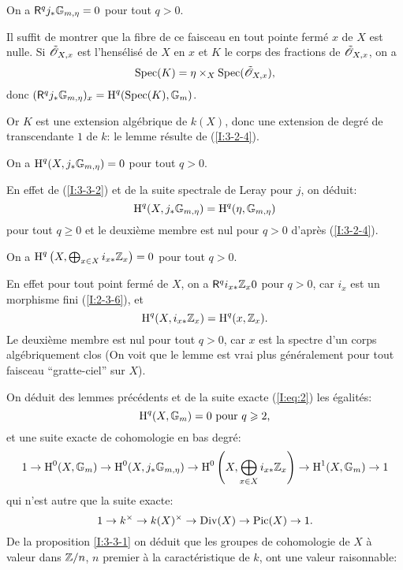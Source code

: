 \documentclass[oneside]{book}
\begin{document}
\begin{lemma}\label{I:3-3-2}
On a $\mathsf{R}^q j_* \mathbb{G}_{m,\eta} = 0$ pour tout $q>0$.
\end{lemma}

Il suffit de montrer que la fibre de ce faisceau en tout pointe fermé $x$ 
de $X$ est nulle. Si $\tilde{\mathscr{O}}_{X,x}$ est l'hensélisé de $X$ en $x$ et $K$ 
le corps des fractions de $\tilde{\mathscr{O}}_{X,x}$, on a 
\[
  \operatorname{Spec}(K) = \eta\times_X \operatorname{Spec}(\tilde{\mathscr{O}}_{X,x})\text{,}
\]
donc $(\mathsf{R}^qj_*\mathbb{G}_{m,\eta})_x = \operatorname{H}^q(\operatorname{Spec}(K),\mathbb{G}_m)$. 

Or $K$ est une extension algébrique de $k(X)$, donc une extension de degré 
de transcendante $1$ de $k$: le lemme résulte de (\ref{I:3-2-4}). 





\begin{lemma}\label{I:3-3-3}
On a $\operatorname{H}^q(X, j_*\mathbb{G}_{m,\eta}) = 0$ pour tout $q>0$.
\end{lemma}

En effet de (\ref{I:3-3-2}) et de la suite spectrale de Leray pour $j$, on 
déduit:
\[
  \operatorname{H}^q(X, j_* \mathbb{G}_{m,\eta}) = \operatorname{H}^q(\eta,\mathbb{G}_{m,\eta})
\]
pour tout $q\geqslant 0$ et le deuxième membre est nul pour $q>0$ d'après 
(\ref{I:3-2-4}). 





\begin{lemma}\label{I:3-3-4}
On a $\operatorname{H}^q\left(X,\bigoplus_{x\in X} i_{x*} \mathbb{Z}_x\right) = 0$ pour tout $q>0$. 
\end{lemma}

En effet pour tout point fermé de $X$, on a $\mathsf{R}^q i_{x*}\mathbb{Z}_x 0$ pour $q>0$, 
car $i_x$ est un morphisme fini (\ref{I:2-3-6}), et 
\[
  \operatorname{H}^q(X,i_{x*}\mathbb{Z}_x) = \operatorname{H}^q(x,\mathbb{Z}_x)\text{.}
\]
Le deuxième membre est nul pour tout $q>0$, car $x$ est la spectre d'un 
corps algébriquement clos (On voit que le lemme est vrai plus 
généralement pour tout faisceau ``gratte-ciel'' sur $X$). 

On déduit des lemmes précédents et de la suite exacte (\ref{I:eq:2}) 
les égalités:
\[
  \operatorname{H}^q(X,\mathbb{G}_m) = 0 \text{ pour $q\geqslant 2$,}
\]
et une suite exacte de cohomologie en bas degré:
\[
  1 \to \operatorname{H}^0(X,\mathbb{G}_m) \to \operatorname{H}^0(X, j_*\mathbb{G}_{m,\eta}) \to \operatorname{H}^0\left(X,\bigoplus_{x\in X} i_{x*}\mathbb{Z}_x\right) \to \operatorname{H}^1(X,\mathbb{G}_m) \to 1
\]
qui n'est autre que la suite exacte:
\[
  1 \to k^\times \to k(X)^\times\to \operatorname{Div}(X) \to \operatorname{Pic}(X) \to 1\text{.}
\]
De la proposition \ref{I:3-3-1} on déduit que les groupes de cohomologie de 
$X$ à valeur dans $\mathbb{Z}/n$, $n$ premier à la caractéristique de $k$, ont 
une valeur raisonnable:
\end{document}
